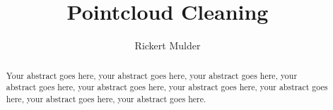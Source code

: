 \documentclass[a4paper,11pt, DIV=calc]{report}
\begin{document}
\pagestyle{plain} %
\title{Pointcloud Cleaning}
\author{Rickert Mulder}
\maketitle

\begin{abstract}
Your abstract goes here, your abstract goes here, your abstract goes here, your abstract goes here, your abstract goes here, your abstract goes here, your abstract goes here, your abstract goes here, your abstract goes here.
\end{abstract}

\tableofcontents
\newpage









{}

\end{document}
